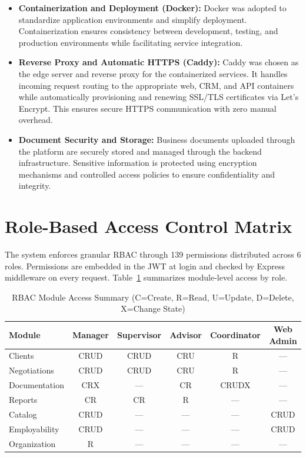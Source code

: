 \documentclass[letterpaper%
, oneside%
, 12pt%
, memoireprojet%
, english%
,creativecommons,hyperref, withAlgo2e %
]{thETS}
\begin{document}
\begin{itemize}
    \item \textbf{Containerization and Deployment (Docker):}
    Docker was adopted to standardize application environments and simplify deployment. Containerization ensures consistency between development, testing, and production environments while facilitating service integration.
    \item \textbf{Reverse Proxy and Automatic HTTPS (Caddy):}
    Caddy was chosen as the edge server and reverse proxy for the containerized services. It handles incoming request routing to the appropriate web, CRM, and API containers while automatically provisioning and renewing SSL/TLS certificates via Let's Encrypt. This ensures secure HTTPS communication with zero manual overhead.
    \item \textbf{Document Security and Storage:}
    Business documents uploaded through the platform are securely stored and managed through the backend infrastructure. Sensitive information is protected using encryption mechanisms and controlled access policies to ensure confidentiality and integrity.
\end{itemize}

\section{Role-Based Access Control Matrix}
The system enforces granular RBAC through 139 permissions distributed across 6 roles. Permissions are embedded in the JWT at login and checked by Express middleware on every request. Table~\ref{tab:rbac_summary} summarizes module-level access by role.

\begin{table}[H]
\centering
\footnotesize
\begin{tabular}{|l|c|c|c|c|c|}
\hline
\textbf{Module} & \textbf{Manager} & \textbf{Supervisor} & \textbf{Advisor} & \textbf{Coordinator} & \textbf{Web Admin} \\ \hline
Clients         & CRUD & CRUD & CRU  & R    & ---  \\ \hline
Negotiations    & CRUD & CRUD & CRU  & R    & ---  \\ \hline
Documentation   & CRX  & ---  & CR   & CRUDX & ---  \\ \hline
Reports         & CR   & CR   & R    & ---  & ---  \\ \hline
Catalog         & CRUD & ---  & ---  & ---  & CRUD \\ \hline
Employability   & CRUD & ---  & ---  & ---  & CRUD \\ \hline
Organization    & R    & ---  & ---  & ---  & ---  \\ \hline
\end{tabular}
\caption{RBAC Module Access Summary (C=Create, R=Read, U=Update, D=Delete, X=Change State)}
\label{tab:rbac_summary}
\end{table}
\end{document}
